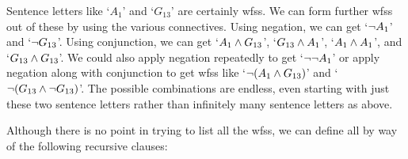 Sentence letters like `$A_1$' and `$G_{13}$' are certainly wfss.
We can form further wfss out of these by using the various connectives.
Using negation, we can get `$\neg A_1$' and `$\neg G_{13}$'.
Using conjunction, we can get `$A_1 \wedge G_{13}$', `$G_{13} \wedge A_1$', `$A_1 \wedge A_1$', and `$G_{13} \wedge G_{13}$'.
We could also apply negation repeatedly to get `$\neg \neg A_1$' or apply negation along with conjunction to get wfss like `$\neg(A_1 \wedge G_{13})$' and `$\neg(G_{13} \wedge \neg G_{13})$'.
The possible combinations are endless, even starting with just these two sentence letters rather than infinitely many sentence letters as above.

%
Although there is no point in trying to list all the wfss, we can define all  by way of the following recursive clauses:


